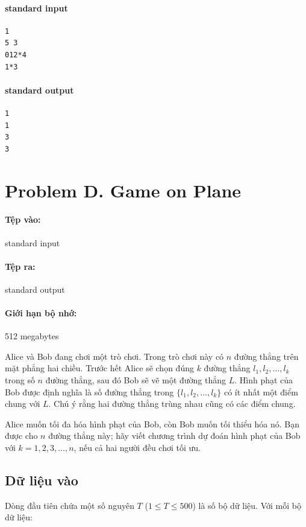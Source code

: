 \documentclass[11pt]{article}
\begin{document}
\paragraph{standard input}
\begin{verbatim}
1
5 3
012*4
1*3
\end{verbatim}

\paragraph{standard output}
\begin{verbatim}
1
1
3
3
\end{verbatim}

\section{Problem D. Game on Plane}

\paragraph{Tệp vào:} standard input
\paragraph{Tệp ra:} standard output
\paragraph{Giới hạn bộ nhớ:} 512 megabytes

Alice và Bob đang chơi một trò chơi. Trong trò chơi này có \(n\) đường thẳng
trên mặt phẳng hai chiều. Trước hết Alice sẽ chọn đúng \(k\) đường thẳng
\(l_1,l_2,\ldots,l_k\) trong số \(n\) đường thẳng, sau đó Bob sẽ vẽ một
đường thẳng \(L\). Hình phạt của Bob được định nghĩa là số đường thẳng trong
\(\{l_1,l_2,\ldots,l_k\}\) có ít nhất một điểm chung với \(L\). Chú ý rằng
hai đường thẳng trùng nhau cũng có các điểm chung.

Alice muốn tối đa hóa hình phạt của Bob, còn Bob muốn tối thiểu hóa nó. Bạn
được cho \(n\) đường thẳng này; hãy viết chương trình dự đoán hình phạt của
Bob với \(k=1,2,3,\ldots,n\), nếu cả hai người đều chơi tối ưu.

\subsection*{Dữ liệu vào}

Dòng đầu tiên chứa một số nguyên \(T\) (\(1\le T\le 500\)) là số bộ dữ liệu.
Với mỗi bộ dữ liệu:
\end{document}
